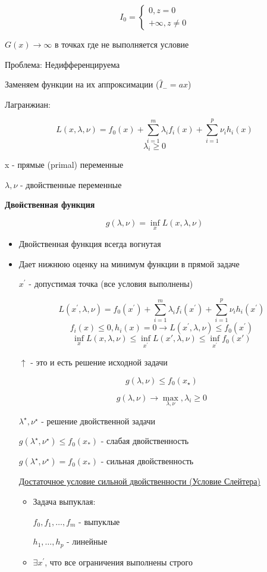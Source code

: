 \documentclass[a4paper, 12pt]{article}
\begin{document}
\[I_{0} = \begin{cases}
    0, z = 0 \\
    + \infty, z \neq 0 
\end{cases}\]

\(G(x) \rightarrow \infty\) в точках где не выполняется условие

Проблема: Недифференцируема

Заменяем функции на их аппроксимации ($\hat{I}_{-} = ax$)

Лагранжиан:

\[L(x, \lambda, \nu) = f_0(x) + \sum_{i = 1}^m \lambda_i f_i(x) + \sum_{i = 1}^p \nu_i h_i(x)\]
\[\lambda_i \geq 0\]

x - прямые (primal) переменные

$\lambda, \nu$ - двойственные переменные

\textbf{Двойственная функция}

\[g(\lambda, \nu) = \inf_{x} L(x, \lambda, \nu)\]

\begin{itemize}
    \item Двойственная функция всегда вогнутая
    \item Дает нижнюю оценку на минимум функции в прямой задаче
    
    \(x^{\prime}\) - допустимая точка (все условия выполнены)

    \[L(x^{\prime}, \lambda, \nu) = f_0(x^{\prime}) + 
    \sum_{i = 1}^m \lambda_i f_i(x^{\prime}) + \sum_{i = 1}^p \nu_i h_i(x^{\prime})\]
    \[f_i(x) \leq 0, h_i(x) = 0 \rightarrow 
    L(x^{\prime}, \lambda, \nu) \leq f_0(x^{\prime})\]
    \[\inf_x L(x, \lambda, \nu) \leq \inf_{x^{\prime}} 
    L(x', \lambda, \nu) \leq \inf_{x^{\prime}} f_0(x')\]

    $\uparrow$ - это и есть решение исходной задачи

    \[g(\lambda, \nu) \leq f_0(x_{\star})\]

    \[g(\lambda, \nu) \rightarrow \max_{\lambda, \nu}, \lambda_i \geq 0\]

    \(\lambda^{\star}, \nu^{\star}\) - решение двойственной задачи

    \(g(\lambda^{\star}, \nu^{\star}) \leq f_0(x_{*})\) - слабая двойственность

    \(g(\lambda^{\star}, \nu^{\star}) = f_0(x_{*})\) - сильная двойственность

    \underline{Достаточное условие сильной двойственности (Условие Слейтера)}

    \begin{itemize}
        \item Задача выпуклая:
        
        \(f_0, f_1, \ldots, f_m\) - выпуклые

        \(h_1, \ldots, h_p\) - линейные
        \item \(\exists x^{\prime}\), что все ограничения выполнены строго
    \end{itemize}
\end{itemize}
\end{document}
